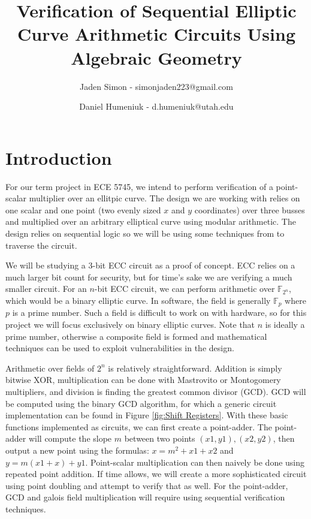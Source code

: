 \documentclass[12pt]{report}
\title{Verification of Sequential Elliptic Curve Arithmetic Circuits Using Algebraic Geometry}
\author{Jaden Simon - simonjaden223@gmail.com \\ \and
	   Daniel Humeniuk - d.humeniuk@utah.edu}
\begin{document}
\maketitle

\section{Introduction}

For our term project in ECE 5745, we intend to perform verification of a point-scalar multiplier over an ellitpic curve. The design we are working with relies on  one scalar and one point (two evenly sized $x$ and $y$ coordinates) over three busses and multiplied over an arbitrary elliptical curve using modular arithmetic. The design relies on sequential logic so we will be using some techniques from \cite{Kalla} to traverse the circuit.

We will be studying a 3-bit ECC circuit as a proof of concept. ECC relies on a much larger bit count for security, but for time's sake we are verifying a much smaller circuit. For an $n$-bit ECC circuit, we can perform arithmetic over $\mathbb{F}_{2^n}$, which would be a binary elliptic curve. In software, the field is generally $\mathbb{F}_{p}$ where $p$ is a prime number. Such a field is difficult to work on with hardware, so for this project we will focus exclusively on binary elliptic curves. Note that $n$ is ideally a prime number, otherwise a composite field is formed and mathematical techniques can be used to exploit vulnerabilities in the design. 

Arithmetic over fields of $2^n$ is relatively straightforward. Addition is simply bitwise XOR, multiplication can be done with Mastrovito or Montogomery multipliers, and division is finding the greatest common divisor (GCD). GCD will be computed using the binary GCD algorithm, for which a generic circuit implementation can be found in Figure \ref{fig:Shift Registers}. With these basic functions implemented as circuits, we can first create a point-adder. The point-adder will compute the slope $m$ between two points $(x1, y1), (x2, y2)$, then output a new point using the formulas: $x = m^2 + x1 + x2$ and $y = m(x1 + x) + y1$. Point-scalar multiplication can then naively be done using repeated point addition. If time allows, we will create a more sophisticated circuit using point doubling and attempt to verify that as well. For the point-adder, GCD and galois field multiplication will require using sequential verification techniques. 
\end{document}
